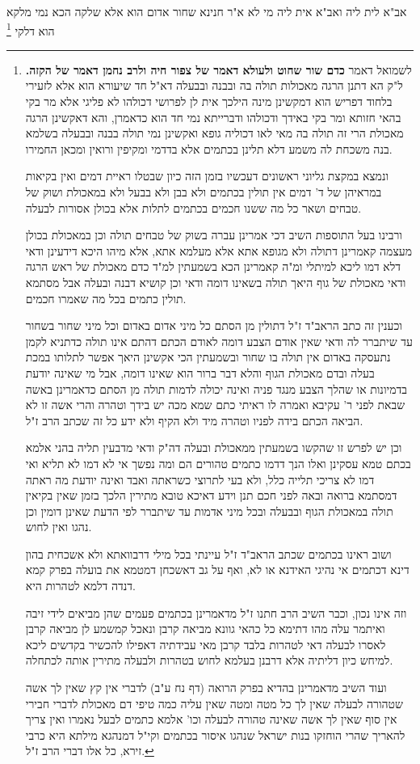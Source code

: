 \documentclass[12pt, openany]{book}
\newcommand{\footnotecomment}[1]{\footnote{#1}}
\newcommand{\commenta}[1]{\footnotecomment{#1}}
\begin{document}
{אב"א  לית ליה ואב"א  אית ליה מי לא א"ר חנינא שחור אדום הוא אלא שלקה הכא נמי מלקא הוא דלקי
\commenta{לשמואל דאמר \textbf{כדם שור שחוט ולעולא דאמר של צפור חיה ולרב נחמן דאמר של הקזה.}  ל"ק הא דתנן הרגה מאכולות תולה בה ובבנה ובבעלה דא"ל חד שיעורא הוא אלא לזעירי בלחוד דפריש הוא דמקשינן מינה הילכך אית לן לפרושי דכולהו לא פליגי אלא מר בקי בהאי חזותא ומר בקי באידך ודכולהו ודברייתא נמי חד הוא כדאמרן, והא דאקשינן הרגה מאכולת הרי זה תולה בה מאי לאו דכוליה גופא ואקשינן נמי תולה בבנה ובבעלה בשלמא בנה משכחת לה משמע דלא תלינן בכתמים אלא בדדמי ומקיפין ורואין ומכאן החמירו.\par  ונמצא במקצת גליוני ראשונים דעכשיו בזמן הזה כיון שבטלו ראיית דמים ואין בקיאות במראיהן של ד' דמים אין תולין בכתמים ולא בבן ולא בבעל ולא במאכולת ושוק של טבחים ושאר כל מה ששנו חכמים בכתמים לתלות אלא בכולן אסורות לבעלה.\par ורבינו בעל התוספות השיב דכי אמרינן עברה בשוק של טבחים תולה וכן במאכולת בכולן מעצמה קאמרינן דתולה ולא מגופא אתא אלא מעלמא אתא, אלא מיהו היכא דידעינן ודאי דלא דמו ליכא למיתלי ומ"ה קאמרינן הכא בשמעתין למ"ד כדם מאכולת של ראש הרגה ודאי מאכולת של גוף היאך תולה בשאינו דומה ודאי וכן קושיא דבנה ובעלה אבל מסתמא תולין כתמים בכל מה שאמרו חכמים.\par  וכענין זה כתב הראב"ד ז"ל דתולין מן הסתם כל מיני אדום באדום וכל מיני שחור בשחור עד שיתברר לה ודאי שאין אודם הצבע דומה לאודם הכתם דהתם אינו תולה כדתניא לקמן נתעסקה באדום אין תולה בו שחור ובשמעתין הכי אקשינן היאך אפשר לתלותו במכת בעלה ובדם מאכולת הגוף והלא דבר ברור הוא שאינו דומה, אבל מי שאינה יודעת בדמיונות או שהלך הצבע מנגד פניה ואינה יכולה לדמות תולה מן הסתם כדאמרינן באשה שבאת לפני ר' עקיבא ואמרה לו ראיתי כתם שמא מכה יש בידך וטהרה והרי אשה זו לא הביאה הכתם בידה לפניו וטהרה מיד ולא הקיף ולא ידע כל זה שכתב הרב ז"ל.\par וכן יש לפרש זו שהקשו בשמעתין ממאכולת ובעלה דה"ק ודאי מדבעין תליה בהני אלמא בכתם טמא עסקינן ואלו הנך דדמו כתמים טהורים הם ומה נפשך אי לא דמו לא תליא ואי דמו לא צריכי תלייה כלל, ולא בעי לתרוצי כשראתה ואבד ואינה יודעת מה ראתה דמסתמא ברואה ובאה לפני חכם תנן וידע דאיכא טובא מתירין הלכך בזמן שאין בקיאין תולה במאכולת הגוף ובבעלה ובכל מיני אדמות עד שיתברר לפי הדעת שאינן דומין וכן נהגו ואין לחוש.\par  ושוב ראינו בכתמים שכתב הראב"ד ז"ל עיינתי בכל מילי דרבוואתא ולא אשכחית בהון דינא דכתמים אי נהיגי האידנא או לא, ואף על גב דאשכחן דמטמא את בועלה בפרק קמא דנדה דלמא לטהרות היא.\par  וזה אינו נכון, וכבר השיב הרב חתנו ז"ל מדאמרינן בכתמים פעמים שהן מביאים לידי זיבה ואיתמר עלה מהו דתימא כל כהאי גוונא מביאה קרבן ונאכל קמשמע לן מביאה קרבן לאסרו לבעלה דאי לטהרות בלבד קרבן מאי עבידתיה דאפילו להכשיר בקדשים ליכא למיחש כיון דליתיה אלא דרבנן בעלמא לחוש בטהרות ולבעלה מתירין אותה לכתחלה.\par  ועוד השיב מדאמרינן בהדיא בפרק הרואה (דף נח ע"ב) לדברי אין קץ שאין לך אשה שטהורה לבעלה שאין לך כל מטה ומטה שאין עליה כמה טיפי דם מאכולת לדברי חבירי אין סוף שאין לך אשה שאינה טהורה לבעלה וכו' אלמא כתמים לבעל נאמרו ואין צריך להאריך שהרי הוחזקו בנות ישראל שנהגו איסור בכתמים וקי"ל דמנהגא מילתא היא כרבי זירא, כל אלו דברי הרב ז"ל. }

}
\end{document}
